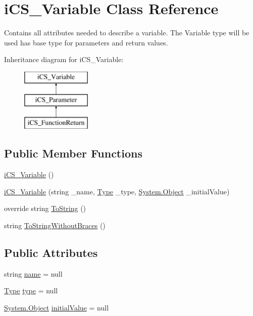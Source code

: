 \hypertarget{classi_c_s___variable}{\section{i\+C\+S\+\_\+\+Variable Class Reference}
\label{classi_c_s___variable}
}


Contains all attributes needed to describe a variable. The Variable type will be used has base type for parameters and return values.  


Inheritance diagram for i\+C\+S\+\_\+\+Variable\+:\begin{figure}[H]
\begin{center}
\leavevmode
\includegraphics[height=3.000000cm]{classi_c_s___variable}
\end{center}
\end{figure}
\subsection*{Public Member Functions}
\begin{DoxyCompactItemize}
\item 
\hyperlink{classi_c_s___variable_a0d64ffe41eb3e83808913216b5f8eb37}{i\+C\+S\+\_\+\+Variable} ()
\item 
\hyperlink{classi_c_s___variable_a5b46c588242a8eb08ce90c2646a52a7c}{i\+C\+S\+\_\+\+Variable} (string \+\_\+name, \hyperlink{i_c_s___object_type_enum_8cs_ae6c3dd6d8597380b56d94908eb431547aa1fa27779242b4902f7ae3bdd5c6d508}{Type} \+\_\+type, \hyperlink{i_c_s___logic_8cs_a5b2c8b05b9a357906d7f9e5b2c1e154d}{System.\+Object} \+\_\+initial\+Value)
\item 
override string \hyperlink{classi_c_s___variable_a9aa1b091007a1619da238bdb8070e275}{To\+String} ()
\item 
string \hyperlink{classi_c_s___variable_a396e1728194670837e8db592136d9961}{To\+String\+Without\+Braces} ()
\end{DoxyCompactItemize}
\subsection*{Public Attributes}
\begin{DoxyCompactItemize}
\item 
string \hyperlink{classi_c_s___variable_aeffa83ae5b7ea919a0d63568d592d2d9}{name} = null
\item 
\hyperlink{i_c_s___object_type_enum_8cs_ae6c3dd6d8597380b56d94908eb431547aa1fa27779242b4902f7ae3bdd5c6d508}{Type} \hyperlink{classi_c_s___variable_a12f508d9b7ec71391a2bf72e2644ccce}{type} = null
\item 
\hyperlink{i_c_s___logic_8cs_a5b2c8b05b9a357906d7f9e5b2c1e154d}{System.\+Object} \hyperlink{classi_c_s___variable_ae97ac70b6db91371846a93ff03c3a222}{initial\+Value} = null
\end{DoxyCompactItemize}


